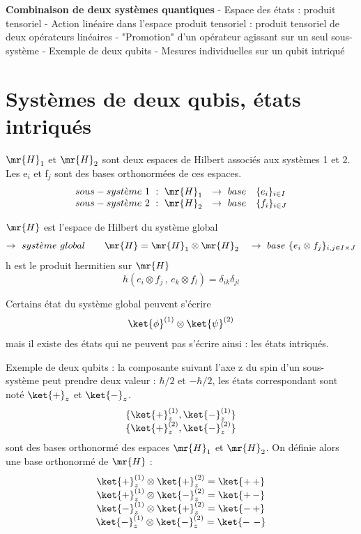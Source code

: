 
{\bf Combinaison de deux systèmes quantiques}
- Espace des états : produit tensoriel
- Action linéaire dans l'espace produit tensoriel : produit tensoriel de deux 
opérateurs linéaires
- "Promotion" d'un opérateur agissant sur un seul sous-système
- Exemple de deux qubits
- Mesures individuelles sur un qubit intriqué

\section{Systèmes de deux qubis, états intriqués}

$\mr{H}_1$ et $\mr{H}_2$ sont deux espaces de Hilbert associés aux systèmes 1 et
2. Les e$_i$ et f$_j$ sont des bases orthonormées de ces espaces.
\[
\begin{array}{llll}
sous-syst\grave{e}me\ 1\ :\ \mr{H}_1 & \to\ base & \{e_i\}_{i\in I} \\
sous-syst\grave{e}me\ 2\ :\ \mr{H}_2 & \to\ base & \{f_i\}_{i\in J} \\
\end{array}
\]

$\mr{H}$ est l'espace de Hilbert du système global
\[
\to\ syst\grave{e}me\ global\qquad \mr{H}=\mr{H}_1\otimes\mr{H}_2
\quad\to\ base\ \{e_i\otimes f_j\}_{i,j\in I\times J}
\]
h est le produit hermitien sur $\mr{H}$
\[
h(e_i\otimes f_j\,,\,e_k\otimes f_l)=\delta_{ik}\delta_{jl}
\]

Certains état du système global peuvent s'écrire
\[
\ket{\phi}^{(1)}\otimes\ket{\psi}^{(2)}
\]
mais il existe des états qui ne peuvent pas s'écrire ainsi : les états intriqués.

Exemple de deux qubits : la composante suivant l'axe z du spin d'un sous-système
peut prendre deux valeur : $\hbar / 2$ et $-\hbar / 2$, les états correspondant
sont noté $\ket{+}_z$ et $\ket{-}_z$.
\[
\begin{array}{ c }
 \{\ket{+}^{(1)}_z,\ket{-}^{(1)}_z\} \\
 \{\ket{+}^{(2)}_z,\ket{-}^{(2)}_z\} \\
\end{array}
\]
sont des bases orthonormé des espaces $\mr{H}_1$ et $\mr{H}_2$. On définie alors une base
orthonormé de $\mr{H}$ :
\[
\begin{array}{ c }
 \ket{+}^{(1)}_z\otimes\ket{+}^{(2)}_z=\ket{+\,+} \\
 \ket{+}^{(1)}_z\otimes\ket{-}^{(2)}_z=\ket{+\,-} \\
 \ket{-}^{(1)}_z\otimes\ket{+}^{(2)}_z=\ket{-\,+} \\
 \ket{-}^{(1)}_z\otimes\ket{-}^{(2)}_z=\ket{-\ -} \\
\end{array}
\]

